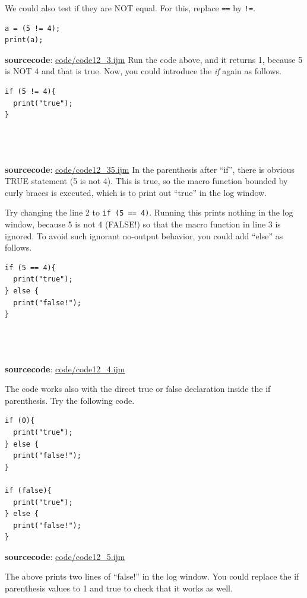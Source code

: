 \documentclass[11pt,a4paper,oneside]{report}
\newcommand{\ilcom}[1]{\texttt{\small#1}}
\begin{document}
We could also test if they are NOT equal. For this, replace \ilcom{==} by
\ilcom{!=}.

\begin{lstlisting}[morekeywords={*, !=}]
a = (5 != 4);
print(a);

\end{lstlisting}
\textbf{sourcecode}: \href{http://www.example.com/contents}{code/code12\_3.ijm}
Run the code above, and it returns 1, because 5 is NOT 4 and that is true. Now,
you could introduce the \textit{if} again as follows.

\begin{lstlisting}[morekeywords={*, if, else}]
if (5 != 4){
  print("true");
} 
  



\end{lstlisting}
\textbf{sourcecode}: \href{http://www.example.com/contents}{code/code12\_35.ijm}
In the parenthesis after ``if'', there is obvious TRUE statement (5 is not 4).
This is true, so the macro function bounded by curly braces is executed, which is to
print out ``true'' in the log window.

Try changing the line 2 to \ilcom{if (5 == 4)}. Running this prints nothing
in the log window, because 5 is not 4 (FALSE!) so that the macro function in
line 3 is ignored. To avoid such ignorant no-output behavior, you could add
``else'' as follows.


\begin{lstlisting}[morekeywords={*, if, else}]
if (5 == 4){
  print("true");
} else {
  print("false!");
}
  



\end{lstlisting}
\textbf{sourcecode}: \href{http://www.example.com/contents}{code/code12\_4.ijm}

The code works also with the direct true or false
declaration inside the if parenthesis. Try the following code.


\begin{lstlisting}[morekeywords={*, if, else}]
if (0){
  print("true");
} else {
  print("false!");
}

if (false){
  print("true");
} else {
  print("false!");
}

\end{lstlisting}
\textbf{sourcecode}: \href{http://www.example.com/contents}{code/code12\_5.ijm}

The above prints two lines of ``false!'' in the log window. You could replace
the if parenthesis values to 1 and true to check that it works as well. 
\end{document}
